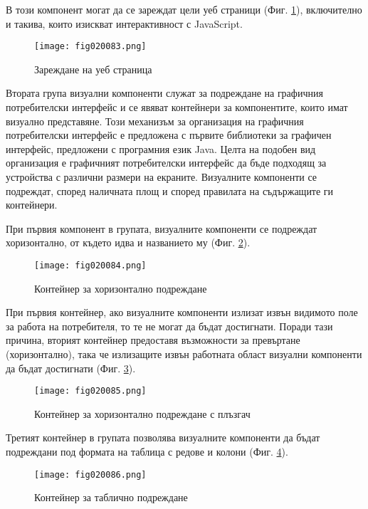 В този компонент могат да се зареждат цели уеб страници (Фиг. \ref{fig020083}), включително и такива, които изискват интерактивност с JavaScript.

\begin{figure}[H]
  \centering
  \texttt{[image: fig020083.png]}
  \caption{Зареждане на уеб страница}
\label{fig020083}
\end{figure}

Втората група визуални компоненти служат за подреждане на графичния потребителски интерфейс и се явяват контейнери за компонентите, които имат визуално представяне. Този механизъм за организация на графичния потребителски интерфейс е предложена с първите библиотеки за графичен интерфейс, предложени с програмния език Java. Целта на подобен вид организация е графичният потребителски интерфейс да бъде подходящ за устройства с различни размери на екраните. Визуалните компоненти се подреждат, според наличната площ и според правилата на съдържащите ги контейнери. 

При първия компонент в групата, визуалните компоненти се подреждат хоризонтално, от където идва и названието му (Фиг. \ref{fig020084}).

\begin{figure}[H]
  \centering
  \texttt{[image: fig020084.png]}
  \caption{Контейнер за хоризонтално подреждане}
\label{fig020084}
\end{figure}

При първия контейнер, ако визуалните компоненти излизат извън видимото поле за работа на потребителя, то те не могат да бъдат достигнати. Поради тази причина, вторият контейнер предоставя възможности за превъртане (хоризонтално), така че излизащите извън работната област визуални компоненти да бъдат достигнати (Фиг. \ref{fig020085}).

\begin{figure}[H]
  \centering
  \texttt{[image: fig020085.png]}
  \caption{Контейнер за хоризонтално подреждане с плъзгач}
\label{fig020085}
\end{figure}

Третият контейнер в групата позволява визуалните компоненти да бъдат подреждани под формата на таблица с редове и колони (Фиг. \ref{fig020086}).

\begin{figure}[H]
  \centering
  \texttt{[image: fig020086.png]}
  \caption{Контейнер за таблично подреждане}
\label{fig020086}
\end{figure}

